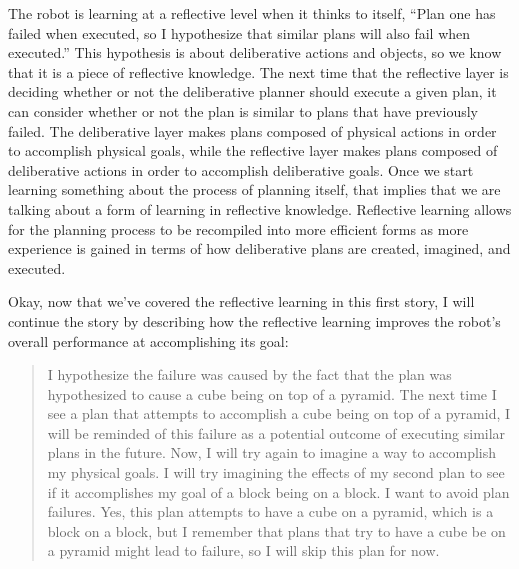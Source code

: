 The robot is learning at a reflective level when it thinks to itself,
``Plan one has failed when executed, so I hypothesize that similar
plans will also fail when executed.''  This hypothesis is about
deliberative actions and objects, so we know that it is a piece of
reflective knowledge.  The next time that the reflective layer is
deciding whether or not the deliberative planner should execute a
given plan, it can consider whether or not the plan is similar to
plans that have previously failed.  The deliberative layer makes plans
composed of physical actions in order to accomplish physical goals,
while the reflective layer makes plans composed of deliberative
actions in order to accomplish deliberative goals.  Once we start
learning something about the process of planning itself, that implies
that we are talking about a form of learning in reflective knowledge.
Reflective learning allows for the planning process to be recompiled
into more efficient forms as more experience is gained in terms of how
deliberative plans are created, imagined, and executed.

Okay, now that we've covered the reflective learning in this first
story, I will continue the story by describing how the reflective
learning improves the robot's overall performance at accomplishing its
goal:
\begin{quote}
  I hypothesize the failure was caused by the fact that the plan was
  hypothesized to cause a cube being on top of a pyramid.  The next
  time I see a plan that attempts to accomplish a cube being on top of
  a pyramid, I will be reminded of this failure as a potential outcome
  of executing similar plans in the future.  Now, I will try again to
  imagine a way to accomplish my physical goals.  I will try imagining
  the effects of my second plan to see if it accomplishes my goal of a
  block being on a block.  I want to avoid plan failures.  Yes, this
  plan attempts to have a cube on a pyramid, which is a block on a
  block, but I remember that plans that try to have a cube be on a
  pyramid might lead to failure, so I will skip this plan for now.
\end{quote}


